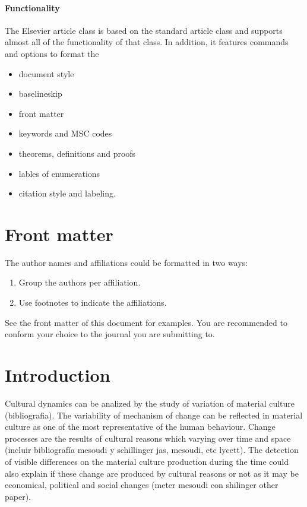 \documentclass[review]{elsarticle}
\begin{document}
\paragraph{Functionality} The Elsevier article class is based on the standard article class and supports almost all of the functionality of that class. In addition, it features commands and options to format the
\begin{itemize}
\item document style
\item baselineskip
\item front matter
\item keywords and MSC codes
\item theorems, definitions and proofs
\item lables of enumerations
\item citation style and labeling.
\end{itemize}

\section{Front matter}

The author names and affiliations could be formatted in two ways:
\begin{enumerate}[(1)]
\item Group the authors per affiliation.
\item Use footnotes to indicate the affiliations.
\end{enumerate}
See the front matter of this document for examples. You are recommended to conform your choice to the journal you are submitting to.



\section{Introduction}

Cultural dynamics can be analized by the study of variation of material culture (bibliografia). The variability of mechanism of change can be reflected in material culture as one of the most representative of the human behaviour. Change processes are the results of cultural reasons which varying over time and space (incluir bibliografía mesoudi y schillinger jas, mesoudi, etc lycett). The detection of visible differences on the material culture production during the time could also explain if these change are produced by cultural reasons or not as it may be economical, political and social changes (meter mesoudi con shilinger other paper).
\end{document}
